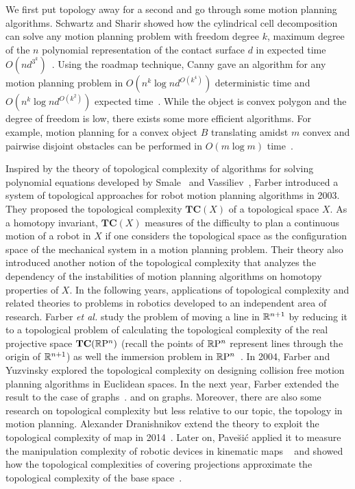 We first put topology away for a second and go through some motion planning algorithms. Schwartz and Sharir showed how the cylindrical cell decomposition can solve any motion planning problem with freedom degree \(k\), maximum degree of the \(n\) polynomial representation of the contact surface \(d\) in expected time \(O(nd^{3^k})\)~\cite{schwartz1983piano}. Using the roadmap technique, Canny gave an algorithm for any motion planning problem in \(O(n^k\log{n}d^{O(k^4)})\) deterministic time and \(O(n^k\log{n}d^{O(k^2)})\) expected time~\cite{canny1988complexity}.
While the object is convex polygon and the degree of freedom is low, there exists some more efficient algorithms. For example, motion planning for a convex object \(B\) translating amidst \(m\) convex and pairwise disjoint obstacles can be performed in \(O(m \log{m})\) time~\cite{sharir1997algorithmic}.

Inspired by the theory of topological complexity of algorithms for solving polynomial equations developed by Smale~\cite{smale2000topology} and Vassiliev~\cite{vassiliev1988cohomology}, Farber introduced a system of topological approaches for robot motion planning algorithms in 2003. They proposed the topological complexity \(\mathbf{TC}(X)\) of a topological space \(X\).
As a homotopy invariant, \(\mathbf{TC}(X)\) measures of the difficulty to plan a continuous motion of a robot in \(X\) if one considers the topological space as the configuration space of the mechanical system in a motion planning problem.
Their theory also introduced another notion of the topological complexity that analyzes the dependency of the instabilities of motion planning algorithms on homotopy properties of \(X\).
In the following years, applications of topological complexity and related theories to problems in robotics developed to an independent area of research.
Farber \emph{et al.} study the problem of moving a line in \(\mathbb{R}^{n+1}\) by reducing it to a topological problem of calculating the topological complexity of the real projective space \(\mathbf{TC}(\mathbb{R}\mathrm{P}^n)\) (recall the points of \(\mathbb{R}\mathrm{P}^n\) represent lines through the origin of \(\mathbb{R}^{n+1}\)) as well the immersion problem in \(\mathbb{R}\mathrm{P}^n\)~\cite{farber2002topological}.
In 2004, Farber and Yuzvinsky explored the topological complexity on designing collision free motion planning algorithms in Euclidean spaces. In the next year, Farber extended the result to the case of graphs~\cite{farber2004collision}.
and on graphs.
Moreover, there are also some research on topological complexity but less relative to our topic, the topology in motion planning.
Alexander Dranishnikov extend the theory to exploit the topological complexity of map in 2014~\cite{dranishnikov2015topological}. Later on, Pave\u{s}i\'c applied it to measure the manipulation complexity of robotic devices in kinematic maps ~\cite{pavevsic2017complexity,pavesic2018topologist} and showed how the topological complexities of covering projections approximate the topological complexity of the base space~\cite{pavevsic2018topological}.

